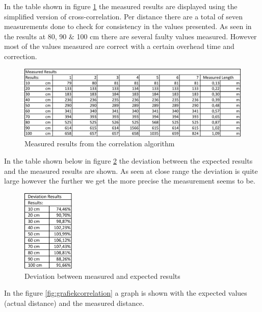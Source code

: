 \documentclass[10pt,a4paper]{article}
\begin{document}
In the table shown in figure \ref{fig:measuredresults} the measured results are displayed using the simplified version of cross-correlation. Per distance there are a total of seven measurements done to check for consistency in the values presented. As seen in the results at 80, 90 $\&$ 100 cm there are several faulty values measured. However most of the values measured are correct with a certain overhead time and correction.

\begin{figure}[H]
   \centering
   \includegraphics[width=\textwidth]{measuredcorrelation.pdf}
   \caption{Measured results from the correlation algorithm}
   \label{fig:measuredresults}
\end{figure}

In the table shown below in figure \ref{fig:deviationresults} the deviation between the expected results and the measured results are shown. As seen at close range the deviation is quite large however the further we get the more precise the measurement seems to be.   

\begin{figure}[H]
   \centering
   \includegraphics[width=0.22\textwidth]{deviationcorrelation.pdf}
   \caption{Deviation between measured and expected results}
   \label{fig:deviationresults}
\end{figure}

In the figure \ref{fig:grafiekcorrelation} a graph is shown with the expected values (actual distance) and the measured distance. 
\end{document}
